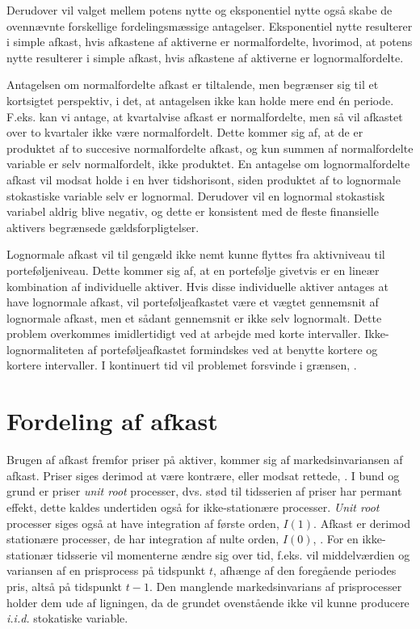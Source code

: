 \documentclass[
  a4paper,
  oneside]{memoir}
\begin{document}
Derudover vil valget mellem potens nytte og eksponentiel nytte også skabe de ovennævnte forskellige fordelingsmæssige antagelser. Eksponentiel nytte resulterer i simple afkast, hvis afkastene af aktiverne er normalfordelte, hvorimod, at potens nytte resulterer i simple afkast, hvis afkastene af aktiverne er lognormalfordelte.

Antagelsen om normalfordelte afkast er tiltalende, men begrænser sig til et kortsigtet perspektiv, i det, at antagelsen ikke kan holde mere end én periode. F.eks. kan vi antage, at kvartalvise afkast er normalfordelte, men så vil afkastet over to kvartaler ikke være normalfordelt. Dette kommer sig af, at de er produktet af to succesive normalfordelte afkast, og kun summen af normalfordelte variable er selv normalfordelt, ikke produktet. En antagelse om lognormalfordelte afkast vil modsat holde i en hver tidshorisont, siden produktet af to lognormale stokastiske variable selv er lognormal. Derudover vil en lognormal stokastisk variabel aldrig blive negativ, og dette er konsistent med de fleste finansielle aktivers begrænsede gældsforpligtelser.

Lognormale afkast vil til gengæld ikke nemt kunne flyttes fra aktivniveau til porteføljeniveau. Dette kommer sig af, at en portefølje givetvis er en lineær kombination af individuelle aktiver. Hvis disse individuelle aktiver antages at have lognormale afkast, vil porteføljeafkastet være et vægtet gennemsnit af lognormale afkast, men et sådant gennemsnit er ikke selv lognormalt. Dette problem overkommes imidlertidigt ved at arbejde med korte intervaller. Ikke-lognormaliteten af porteføljeafkastet formindskes ved at benytte kortere og kortere intervaller. I kontinuert tid vil problemet forsvinde i grænsen, \citep{CampVic2003}.

\hypertarget{fordafafk}{%
\section{Fordeling af afkast}\label{fordafafk}}

Brugen af afkast fremfor priser på aktiver, kommer sig af markedsinvariansen af afkast. Priser siges derimod at være kontrære, eller modsat rettede, \citep{Jondeau2007}. I bund og grund er priser \emph{unit root} processer, dvs. stød til tidsserien af priser har permant effekt, dette kaldes undertiden også for ikke-stationære processer. \emph{Unit root} processer siges også at have integration af første orden, \(I(1)\). Afkast er derimod stationære processer, de har integration af nulte orden, \(I(0)\), \citep{Verbeek2017}. For en ikke-stationær tidsserie vil momenterne ændre sig over tid, f.eks. vil middelværdien og variansen af en prisprocess på tidspunkt \(t\), afhænge af den foregående periodes pris, altså på tidspunkt \(t-1\). Den manglende markedsinvarians af prisprocesser holder dem ude af ligningen, da de grundet ovenstående ikke vil kunne producere \emph{i.i.d.} stokatiske variable.
\end{document}
